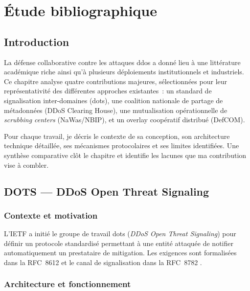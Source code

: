 ﻿%
\chapter{Étude bibliographique}
\label{chap:etat_art}

\section{Introduction}

La défense collaborative contre les attaques \gls{ddos} a donné lieu à une littérature académique riche ainsi qu'à plusieurs déploiements institutionnels et industriels. Ce chapitre analyse quatre contributions majeures, sélectionnées pour leur représentativité des différentes approches existantes~: un standard de signalisation inter-domaines (\gls{dots}), une coalition nationale de partage de métadonnées (DDoS Clearing House), une mutualisation opérationnelle de \textit{scrubbing centers} (NaWas/NBIP), et un overlay coopératif distribué (DefCOM).

Pour chaque travail, je décris le contexte de sa conception, son architecture technique détaillée, ses mécanismes protocolaires et ses limites identifiées. Une synthèse comparative clôt le chapitre et identifie les lacunes que ma contribution vise à combler.

\section{DOTS --- DDoS Open Threat Signaling}
\label{sec:dots}

\subsection{Contexte et motivation}

L'IETF a initié le groupe de travail \gls{dots} (\textit{DDoS Open Threat Signaling}) pour définir un protocole standardisé permettant à une entité attaquée de notifier automatiquement un prestataire de mitigation. Les exigences sont formalisées dans la RFC~8612 \parencite{mortensen2019dots} et le canal de signalisation dans la RFC~8782 \parencite{reddy2020dots}.

\subsection{Architecture et fonctionnement}

